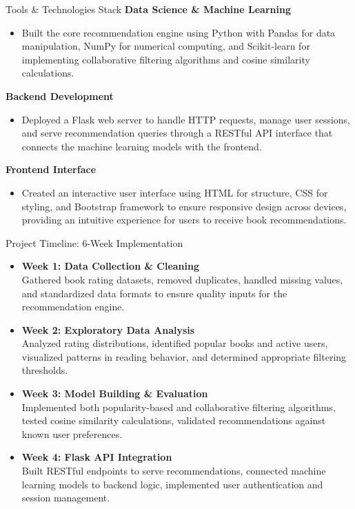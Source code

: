 \documentclass{beamer}
\begin{document}
\begin{frame}{Tools \& Technologies Stack}
  \textbf{Data Science \& Machine Learning}
  \begin{itemize}
      \item Built the core recommendation engine using Python with Pandas for data manipulation, NumPy for numerical computing, and Scikit-learn for implementing collaborative filtering algorithms and cosine similarity calculations.
  \end{itemize}
  
  \vspace{0.2cm}
  \textbf{Backend Development}
  \begin{itemize}
      \item Deployed a Flask web server to handle HTTP requests, manage user sessions, and serve recommendation queries through a RESTful API interface that connects the machine learning models with the frontend.
  \end{itemize}

  \vspace{0.2cm}
  \textbf{Frontend Interface}
  \begin{itemize}
      \item Created an interactive user interface using HTML for structure, CSS for styling, and Bootstrap framework to ensure responsive design across devices, providing an intuitive experience for users to receive book recommendations.
  \end{itemize}
\end{frame}

\begin{frame}{Project Timeline: 6-Week Implementation}
  \begin{itemize}
      \item \textbf{Week 1: Data Collection \& Cleaning} \\ Gathered book rating datasets, removed duplicates, handled missing values, and standardized data formats to ensure quality inputs for the recommendation engine.
      \item \textbf{Week 2: Exploratory Data Analysis} \\ Analyzed rating distributions, identified popular books and active users, visualized patterns in reading behavior, and determined appropriate filtering thresholds.
      \item \textbf{Week 3: Model Building \& Evaluation} \\ Implemented both popularity-based and collaborative filtering algorithms, tested cosine similarity calculations, validated recommendations against known user preferences.
      \item \textbf{Week 4: Flask API Integration} \\ Built RESTful endpoints to serve recommendations, connected machine learning models to backend logic, implemented user authentication and session management.
  \end{itemize}
\end{frame}
\end{document}
